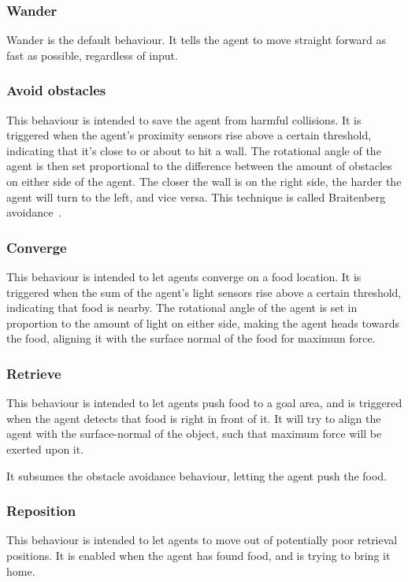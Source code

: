 \documentclass[a4paper]{article}
\begin{document}
\subsubsection{Wander}
Wander is the default behaviour.
It tells the agent to move straight forward as fast as possible, regardless of input.

\subsubsection{Avoid obstacles}
This behaviour is intended to save the agent from harmful collisions.
It is triggered when the agent's proximity sensors rise above a certain threshold, indicating that it's close to or about to hit a wall.
The rotational angle of the agent is then set proportional to the difference between the amount of obstacles on either side of the agent.
The closer the wall is on the right side, the harder the agent will turn to the left, and vice versa.
This technique is called Braitenberg avoidance~\cite{braitenberg}.

\subsubsection{Converge}
This behaviour is intended to let agents converge on a food location.
It is triggered when the sum of the agent's light sensors rise above a certain threshold, indicating that food is nearby.
The rotational angle of the agent is set in proportion to the amount of light on either side, making the agent heads towards the food, aligning it with the surface normal of the food for maximum force.

\subsubsection{Retrieve}
This behaviour is intended to let agents push food to a goal area, and is triggered when the agent detects that food is right in front of it.
It will try to align the agent with the surface-normal of the object, such that maximum force will be exerted upon it.

It subsumes the obstacle avoidance behaviour, letting the agent push the food.

\subsubsection{Reposition}
This behaviour is intended to let agents to move out of potentially poor retrieval positions.
It is enabled when the agent has found food, and is trying to bring it home.
\end{document}
